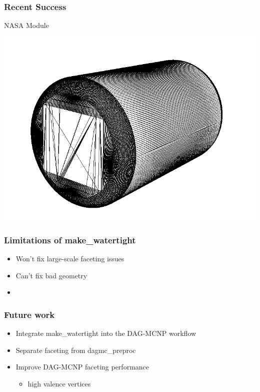 \documentclass[14pt]{beamer}
\begin{document}
\begin{frame}
\frametitle{Recent Success}

NASA Module
\begin{center}
\includegraphics[scale=0.35]{bad_facets.png}
\end{center}
\end{frame}

\begin{frame}
\frametitle{Limitations of make\_watertight}
\begin{itemize}
\item Won't fix large-scale faceting issues
\item Can't fix bad geometry
\item 
\end{itemize}
\end{frame}

\begin{frame}
\frametitle{Future work}
\begin{itemize}
\item Integrate make\_watertight into the DAG-MCNP workflow
\item Separate faceting from dagmc\_preproc
\item Improve DAG-MCNP faceting performance
	\begin{itemize}
	\item high valence vertices
	\end{itemize}
\end{itemize}
\end{frame}
\end{document}
